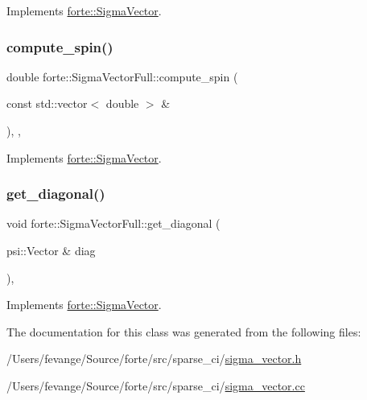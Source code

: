 Implements \mbox{\hyperlink{classforte_1_1_sigma_vector_afa184f816a37649a4e2316d62c8b621e}{forte\+::\+Sigma\+Vector}}.

\mbox{\label{classforte_1_1_sigma_vector_full_a7415d04fe0728963ebd1b47871400aff}} 
\subsubsection{\texorpdfstring{compute\+\_\+spin()}{compute\_spin()}}
{\footnotesize\ttfamily double forte\+::\+Sigma\+Vector\+Full\+::compute\+\_\+spin (\begin{DoxyParamCaption}\item[{const std\+::vector$<$ double $>$ \&}]{ }\end{DoxyParamCaption})\hspace{0.3cm}{\ttfamily [inline]}, {\ttfamily [override]}, {\ttfamily [virtual]}}



Implements \mbox{\hyperlink{classforte_1_1_sigma_vector_afe5ac487b5277b86fbe4398ba861773c}{forte\+::\+Sigma\+Vector}}.

\mbox{\label{classforte_1_1_sigma_vector_full_acee1551f85b3f744e12a49ed1e93f942}} 
\subsubsection{\texorpdfstring{get\+\_\+diagonal()}{get\_diagonal()}}
{\footnotesize\ttfamily void forte\+::\+Sigma\+Vector\+Full\+::get\+\_\+diagonal (\begin{DoxyParamCaption}\item[{psi\+::\+Vector \&}]{diag }\end{DoxyParamCaption})\hspace{0.3cm}{\ttfamily [override]}, {\ttfamily [virtual]}}



Implements \mbox{\hyperlink{classforte_1_1_sigma_vector_a4df4b96c5c24a3560a874eae061a502e}{forte\+::\+Sigma\+Vector}}.



The documentation for this class was generated from the following files\+:\begin{DoxyCompactItemize}
\item 
/\+Users/fevange/\+Source/forte/src/sparse\+\_\+ci/\mbox{\hyperlink{sigma__vector_8h}{sigma\+\_\+vector.\+h}}\item 
/\+Users/fevange/\+Source/forte/src/sparse\+\_\+ci/\mbox{\hyperlink{sigma__vector_8cc}{sigma\+\_\+vector.\+cc}}\end{DoxyCompactItemize}
